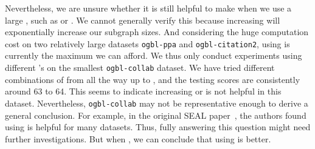 \documentclass{article}
\begin{document}
Nevertheless, we are unsure whether it is still helpful to make  when we use a large , such as  or . We cannot generally verify this because increasing  will exponentially increase our subgraph sizes. And considering the huge computation cost on two relatively large datasets \texttt{ogbl-ppa} and \texttt{ogbl-citation2}, using  is currently the maximum  we can afford. We thus only conduct experiments using different 's on the smallest \texttt{ogbl-collab} dataset. We have tried different combinations of  from  all the way up to , and the testing scores are consistently around 63 to 64. This seems to indicate increasing  or  is not helpful in this dataset. Nevertheless, \texttt{ogbl-collab} may not be representative enough to derive a general conclusion. For example, in the original SEAL paper~\citep{zhang2018link}, the authors found using  is helpful for many datasets. Thus, fully answering this question might need further investigations. But when , we can conclude that using  is better.
\end{document}
